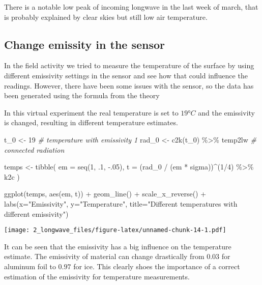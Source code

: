 \documentclass[
]{article}
\newenvironment{Shaded}{\begin{snugshade}}{\end{snugshade}}
\newcommand{\AttributeTok}[1]{\textcolor[rgb]{0.77,0.63,0.00}{#1}}
\newcommand{\CommentTok}[1]{\textcolor[rgb]{0.56,0.35,0.01}{\textit{#1}}}
\newcommand{\DecValTok}[1]{\textcolor[rgb]{0.00,0.00,0.81}{#1}}
\newcommand{\FunctionTok}[1]{\textcolor[rgb]{0.00,0.00,0.00}{#1}}
\newcommand{\NormalTok}[1]{#1}
\newcommand{\OtherTok}[1]{\textcolor[rgb]{0.56,0.35,0.01}{#1}}
\newcommand{\SpecialCharTok}[1]{\textcolor[rgb]{0.00,0.00,0.00}{#1}}
\newcommand{\StringTok}[1]{\textcolor[rgb]{0.31,0.60,0.02}{#1}}
\begin{document}
There is a notable low peak of incoming longwave in the last week of
march, that is probably explained by clear skies but still low air
temperature.

\newpage

\hypertarget{change-emissity-in-the-sensor}{%
\subsection{Change emissity in the
sensor}\label{change-emissity-in-the-sensor}}

In the field activity we tried to measure the temperature of the surface
by using different emissivity settings in the sensor and see how that
could influence the readings. However, there have been some issues with
the sensor, so the data has been generated using the formula from the
theory

In this virtual experiment the real temperature is set to \(19 °C\) and
the emissivity is changed, resulting in different temperature estimates.

\begin{Shaded}
\begin{Highlighting}[]
\NormalTok{t\_0 }\OtherTok{\textless{}{-}} \DecValTok{19} \CommentTok{\# temperature with emissivity 1}
\NormalTok{rad\_0 }\OtherTok{\textless{}{-}} \FunctionTok{c2k}\NormalTok{(t\_0) }\SpecialCharTok{\%\textgreater{}\%}\NormalTok{ temp2lw }\CommentTok{\# connected radiation }

\NormalTok{temps }\OtherTok{\textless{}{-}} \FunctionTok{tibble}\NormalTok{(}
  \AttributeTok{em =} \FunctionTok{seq}\NormalTok{(}\DecValTok{1}\NormalTok{, .}\DecValTok{1}\NormalTok{, }\SpecialCharTok{{-}}\NormalTok{.}\DecValTok{05}\NormalTok{),}
  \AttributeTok{t =}\NormalTok{ (rad\_0 }\SpecialCharTok{/}\NormalTok{ (em }\SpecialCharTok{*}\NormalTok{ sigma))}\SpecialCharTok{\^{}}\NormalTok{(}\DecValTok{1}\SpecialCharTok{/}\DecValTok{4}\NormalTok{)  }\SpecialCharTok{\%\textgreater{}\%}\NormalTok{ k2c}
\NormalTok{) }
\end{Highlighting}
\end{Shaded}

\begin{Shaded}
\begin{Highlighting}[]
\FunctionTok{ggplot}\NormalTok{(temps, }\FunctionTok{aes}\NormalTok{(em, t)) }\SpecialCharTok{+}
  \FunctionTok{geom\_line}\NormalTok{() }\SpecialCharTok{+}
  \FunctionTok{scale\_x\_reverse}\NormalTok{() }\SpecialCharTok{+}
  \FunctionTok{labs}\NormalTok{(}\AttributeTok{x=}\StringTok{"Emissivity"}\NormalTok{, }\AttributeTok{y=}\StringTok{"Temperature"}\NormalTok{, }\AttributeTok{title=}\StringTok{"Different temperatures with different emissivity"}\NormalTok{)}
\end{Highlighting}
\end{Shaded}

\texttt{[image: 2\_longwave\_files/figure-latex/unnamed-chunk-14-1.pdf]}

It can be seen that the emissivity has a big influence on the
temperature estimate. The emissivity of material can change drastically
from \(0.03\) for aluminum foil to \(0.97\) for ice. This clearly shoes
the importance of a correct estimation of the emissivity for temperature
measurements.
\end{document}
